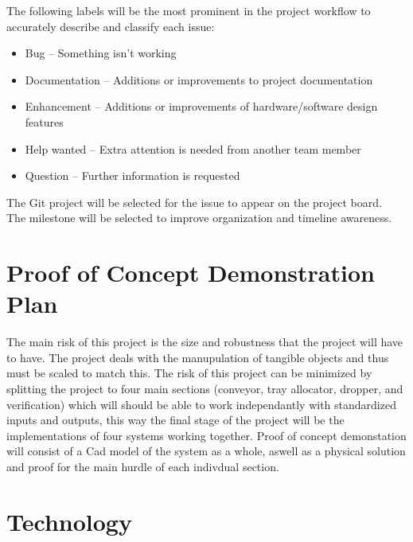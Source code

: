 \documentclass{article}
\begin{document}
	\noindent The following labels will be the most prominent in the project workflow to accurately describe and classify each issue: 

	\begin{itemize}
		\item Bug – Something isn’t working
		\item Documentation – Additions or improvements to project documentation 
		\item Enhancement – Additions or improvements of hardware/software design features 
		\item Help wanted – Extra attention is needed from another team member 
		\item Question – Further information is requested 
	\end{itemize}
	\noindent The Git project will be selected for the issue to appear on the project board.\\

	\noindent The milestone will be selected to improve organization and timeline awareness.\\
	
	\section{Proof of Concept Demonstration Plan}
	
	The main risk of this project is the size and robustness that the project will have to have. The project deals with the manupulation of tangible objects and thus must be scaled to match this.
	The risk of this project can be minimized by splitting the project to four main sections (conveyor, tray allocator, dropper, and verification) which will should be able to work independantly with standardized inputs and outputs, this way the final stage of the project will be 
	the implementations of four systems working together. Proof of concept demonstation will consist of a Cad model of the system as a whole, aswell as a physical solution and proof for the main hurdle of each indivdual section.
	
	
	\section{Technology}
	
\end{document}
